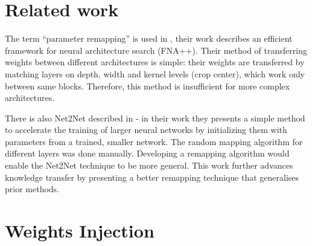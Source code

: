 \documentclass{article} %
\begin{document}
\section{Related work}

The term ``parameter remapping'' is used in \citep{fang2020fna++}, their work
describes an efficient framework for neural architecture search (FNA++).
%
Their method of transferring weights between different architectures is simple:
their weights are transferred by matching layers on depth, width and kernel
levels (crop center), which work only between same blocks.
%
Therefore, this method is insufficient for more complex architectures.

There is also Net2Net described in \citep{chen2015net2net} - in their work they
presents a simple method to accelerate the training of larger neural networks by
initializing them with parameters from a trained, smaller network.
%
The random mapping algorithm for different layers was done manually.
%
Developing a remapping algorithm would enable the Net2Net technique to be more
general.
%
This work further advances knowledge transfer by presenting a better remapping
technique that generalises prior methods.


\section{Weights Injection}
\end{document}
